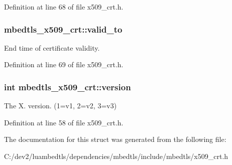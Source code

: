 Definition at line 68 of file x509\-\_\-crt.\-h.

\hypertarget{structmbedtls__x509__crt_a05af94003d5948703ca537b6a5f2d5b4}{
\subsubsection[{valid\-\_\-to}]{ mbedtls\-\_\-x509\-\_\-crt\-::valid\-\_\-to}}\label{structmbedtls__x509__crt_a05af94003d5948703ca537b6a5f2d5b4}
End time of certificate validity. 

Definition at line 69 of file x509\-\_\-crt.\-h.

\hypertarget{structmbedtls__x509__crt_a879ea07a05ab857c0f5793572bf1696e}{
\subsubsection[{version}]{\setlength{\rightskip}{0pt plus 5cm}int mbedtls\-\_\-x509\-\_\-crt\-::version}}\label{structmbedtls__x509__crt_a879ea07a05ab857c0f5793572bf1696e}
The X. version. (1=v1, 2=v2, 3=v3) 

Definition at line 58 of file x509\-\_\-crt.\-h.



The documentation for this struct was generated from the following file\-:\begin{DoxyCompactItemize}
\item 
C\-:/dev2/luambedtls/dependencies/mbedtls/include/mbedtls/x509\-\_\-crt.\-h\end{DoxyCompactItemize}
